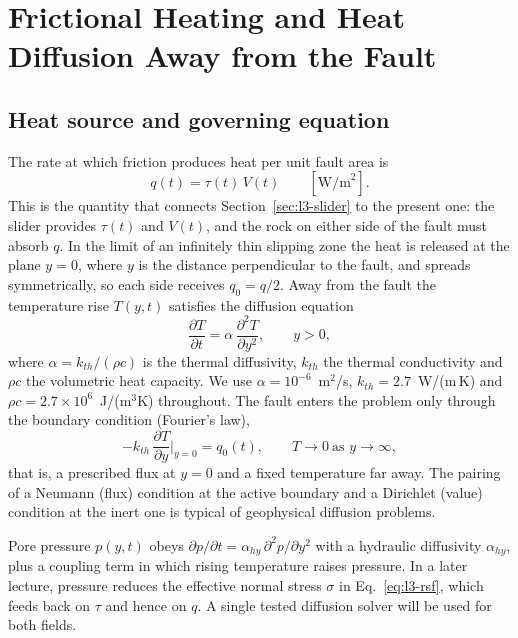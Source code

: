 \section{Frictional Heating and Heat Diffusion Away from the Fault}
\label{sec:l3-heat}

\subsection{Heat source and governing equation}

The rate at which friction produces heat per unit fault area is
\begin{equation}
q(t)=\tau(t)\,V(t)\qquad[\text{W/m}^2].
\label{eq:l3-heat-rate}
\end{equation}
This is the quantity that connects Section~\ref{sec:l3-slider} to the present one: the slider provides $\tau(t)$ and $V(t)$, and the rock on either side of the fault must absorb $q$. In the limit of an infinitely thin slipping zone the heat is released at the plane $y=0$, where $y$ is the distance perpendicular to the fault, and spreads symmetrically, so each side receives $q_0=q/2$. Away from the fault the temperature rise $T(y,t)$ satisfies the diffusion equation
\begin{equation}
\frac{\partial T}{\partial t}=\alpha\,\frac{\partial^2T}{\partial y^2},\qquad y>0,
\label{eq:l3-diffusion}
\end{equation}
where $\alpha=k_{th}/(\rho c)$ is the thermal diffusivity, $k_{th}$ the thermal conductivity and $\rho c$ the volumetric heat capacity. We use $\alpha=10^{-6}$~m$^2$/s, $k_{th}=2.7$~W/(m\,K) and $\rho c=2.7\times10^6$~J/(m$^3$K) throughout. The fault enters the problem only through the boundary condition (Fourier's law),
\begin{equation}
-k_{th}\,\frac{\partial T}{\partial y}\Big|_{y=0}=q_0(t),\qquad T\to0\ \text{as } y\to\infty,
\label{eq:l3-bc}
\end{equation}
that is, a prescribed flux at $y=0$ and a fixed temperature far away. The pairing of a Neumann (flux) condition at the active boundary and a Dirichlet (value) condition at the inert one is typical of geophysical diffusion problems.

\begin{remark}
Pore pressure $p(y,t)$ obeys $\partial p/\partial t=\alpha_{hy}\,\partial^2p/\partial y^2$ with a hydraulic diffusivity $\alpha_{hy}$, plus a coupling term in which rising temperature raises pressure. In a later lecture, pressure reduces the effective normal stress $\sigma$ in Eq.~\eqref{eq:l3-rsf}, which feeds back on $\tau$ and hence on $q$. A single tested diffusion solver will be used for both fields.
\end{remark}

